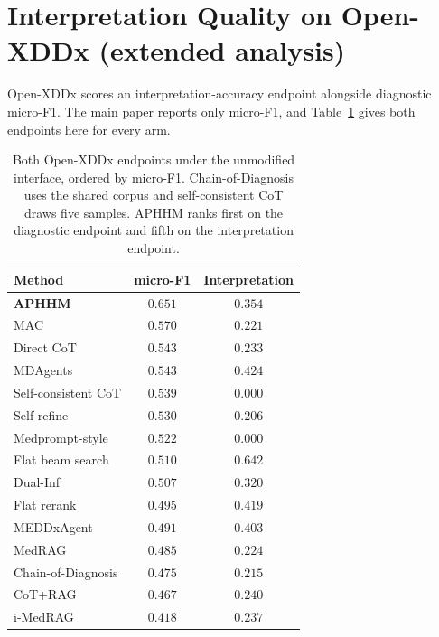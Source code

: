 \documentclass[letterpaper]{article}
\begin{document}
\section{Interpretation Quality on Open-XDDx (extended analysis)}
\label{sec:interp}

Open-XDDx scores an interpretation-accuracy endpoint alongside diagnostic micro-F1.
The main paper reports only micro-F1, and Table~\ref{tab:interp} gives both endpoints here for every arm.

\begin{table}[tb]
\centering
\footnotesize
\begin{tabular}{@{}lcc@{}}
\toprule
Method & micro-F1 & Interpretation \\
\midrule
\textbf{APHHM} & $\mathbf{0.651}$ & $0.354$ \\
MAC & $0.570$ & $0.221$ \\
Direct CoT & $0.543$ & $0.233$ \\
MDAgents & $0.543$ & $0.424$ \\
Self-consistent CoT & $0.539$ & $0.000$ \\
Self-refine & $0.530$ & $0.206$ \\
Medprompt-style & $0.522$ & $0.000$ \\
Flat beam search & $0.510$ & $\mathbf{0.642}$ \\
Dual-Inf & $0.507$ & $0.320$ \\
Flat rerank & $0.495$ & $0.419$ \\
MEDDxAgent & $0.491$ & $0.403$ \\
MedRAG & $0.485$ & $0.224$ \\
Chain-of-Diagnosis & $0.475$ & $0.215$ \\
CoT+RAG & $0.467$ & $0.240$ \\
i-MedRAG & $0.418$ & $0.237$ \\
\bottomrule
\end{tabular}
\caption{Both Open-XDDx endpoints under the unmodified interface, ordered by micro-F1. Chain-of-Diagnosis uses the shared corpus and self-consistent CoT draws five samples. APHHM ranks first on the diagnostic endpoint and fifth on the interpretation endpoint.}
\label{tab:interp}
\end{table}
\end{document}
